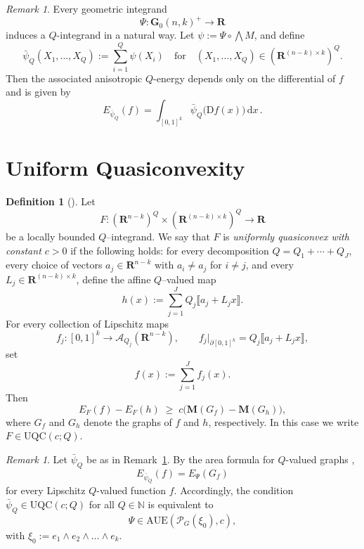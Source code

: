 \documentclass[a4paper,twoside,reqno]{article}
\theoremstyle{definition}
\theoremstyle{remark}
\theoremstyle{plain}
\theoremstyle{remark}
\newtheorem{remark}[theorem]{Remark}
\theoremstyle{definition}
\newtheorem{definition}[theorem]{Definition}
\newcommand{\ograss}[2]{\mathbf{G}_0(#1,#2)}
\newcommand{\Mass}{\mathbf{M}}
\newcommand{\natp}{\mathbb{N}}
\newcommand{\AUE}{\mathrm{AUE}}
\newcommand{\UQC}{\mathrm{UQC}}
\newcommand{\R}{\mathbf{R}}
\newcommand{\ud}{\ensuremath{\,\mathrm{d}}}
\newcommand{\uD}{\ensuremath{\mathrm{D}}}
\newcommand{\tbwedge}{{\textstyle \boldsymbol{\bigwedge}}}
\newcommand{\qspace}[1]{\mathcal{A}_{{#1}}}
\begin{document}
\begin{remark}\label{rem:geom_Q_integrand}
    Every geometric integrand
    \[
        \Psi : \ograss{n}{k}^{+} \to \R
    \]
    induces a $Q$-integrand in a natural way. Let 
    $\psi := \Psi \circ \tbwedge M$, and define
    \[
        \bar{\psi}_Q(X_1,\ldots,X_Q)
        :=
        \sum_{i=1}^Q \psi(X_i)
        \quad
        \text{for}
        \quad
        (X_1,\ldots,X_Q) \in (\R^{(n-k)\times k})^Q.
    \]
    Then the associated anisotropic $Q$-energy depends only on the differential
    of $f$ and is given by
    \[
        E_{\bar{\psi}_Q}(f)
        =
        \int_{[0,1]^k}
            \bar{\psi}_Q\bigl(\uD f(x)\bigr) \ud x \,.
    \]
\end{remark}

\section{Uniform Quasiconvexity}\label{section:uniform_quasiconvexity}

\begin{definition}[]
    \label{def:uniform_quasiconvexity}
    Let
    \[
        F : (\R^{n-k})^Q \times (\R^{(n-k)\times k})^Q \to \R
    \]
    be a locally bounded $Q$--integrand.
    We say that $F$ is \emph{uniformly quasiconvex with constant $c>0$} if the
    following holds: for every decomposition $Q = Q_1 + \cdots + Q_J$, every 
    choice of vectors $a_j \in \R^{n-k}$ with $a_i \neq a_j$ for 
    $i \neq j$, and every $L_j \in \R^{(n-k)\times k}$, define the
     affine $Q$--valued map
    \[
        h(x) := \sum_{j=1}^J Q_j \llbracket a_j + L_j x \rrbracket .
    \]
    For every collection of Lipschitz maps
    \[
        f_j : [0,1]^k \to \qspace{Q_j}(\R^{n-k}),
        \qquad
        f_j|_{\partial [0,1]^k} = Q_j \llbracket a_j + L_j x \rrbracket ,
    \]
    set
    \[
        f(x) := \sum_{j=1}^{J} f_j(x).
    \]
    Then
    \[
        E_F(f) - E_F(h)
        \;\ge\;
        c \bigl( \Mass(G_f) - \Mass(G_h) \bigr),
    \]
    where $G_f$ and $G_h$ denote the graphs of $f$ and $h$, respectively.
    In this case we write $F \in \UQC(c; Q)$.
\end{definition}

\begin{remark}\label{rem:aue_uqc}
    Let $\bar{\psi}_Q$ be as in Remark~\ref{rem:geom_Q_integrand}.  
    By the area formula for $Q$-valued graphs \cite[1.11]{delellis2013multiplevaluedfunctionsintegral},  
    \[
        E_{\bar{\psi}_Q}(f) = E_{\Psi}(G_f)
    \] 
    for every Lipschitz $Q$-valued function $f$.  
    Accordingly, the condition $\bar{\psi}_Q \in \UQC(c; Q)$ for all $Q \in \natp$  
    is equivalent to 
    \[
        \Psi \in \AUE(\mathcal{P}_G(\xi_0), c),
    \] 
    with $\xi_0 := e_1 \wedge e_2 \wedge \dots \wedge e_k$.
\end{remark}
\end{document}

